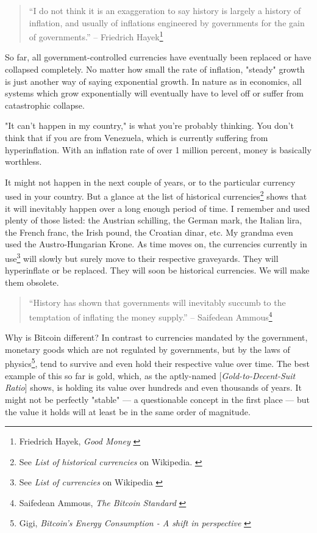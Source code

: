 \begin{quotation}
``I do not think it is an exaggeration to say history is largely a
history of inflation, and usually of inflations engineered by
governments for the gain of governments.''
\flushright -- Friedrich Hayek\footnote{Friedrich Hayek, \textit{Good Money} \cite{hayek-good-money}}
\end{quotation}

So far, all government-controlled currencies have eventually been
replaced or have collapsed completely. No matter how small the rate of
inflation, "steady" growth is just another way of saying exponential
growth. In nature as in economics, all systems which grow exponentially
will eventually have to level off or suffer from catastrophic collapse.

"It can't happen in my country," is what you're probably thinking. You don't
think that if you are from Venezuela, which is currently suffering from
hyperinflation. With an inflation rate of over 1 million percent, money is
basically worthless. \cite{wiki:venezuela}

It might not happen in the next couple of years, or to the particular currency
used in your country. But a glance at the list of historical
currencies\footnote{See \textit{List of historical currencies} on Wikipedia.
\cite{wiki:historical-currencies}} shows that it will inevitably happen over a
long enough period of time. I remember and used plenty of those listed: the
Austrian schilling, the German mark, the Italian lira, the French franc, the
Irish pound, the Croatian dinar, etc. My grandma even used the Austro-Hungarian
Krone. As time moves on, the currencies currently in use\footnote{See
\textit{List of currencies} on Wikipedia \cite{wiki:list-of-currencies}} will
slowly but surely move to their respective graveyards. They will hyperinflate or
be replaced. They will soon be historical currencies. We will make them
obsolete.

\begin{quotation}
``History has shown that governments will inevitably succumb to the
temptation of inflating the money supply.''
\flushright -- Saifedean Ammous\footnote{Saifedean Ammous, \textit{The Bitcoin
Standard} \cite{bitcoin-standard}}
\end{quotation}

Why is Bitcoin different? In contrast to currencies mandated by the government,
monetary goods which are not regulated by governments, but by the laws of
physics\footnote{Gigi, \textit{Bitcoin's Energy Consumption - A shift in
perspective} \cite{gigi:energy}}, tend to survive and even hold their respective
value over time. The best example of this so far is gold, which, as the
aptly-named [\textit{Gold-to-Decent-Suit Ratio}] shows, is holding its value
over hundreds and even thousands of years. It might not be perfectly "stable"
--- a questionable concept in the first place --- but the value it holds will at
least be in the same order of magnitude.

